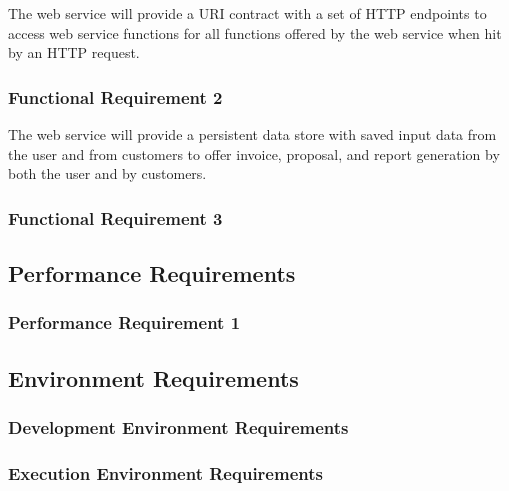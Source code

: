 \documentclass{article}
\begin{document}
The web service will provide a URI contract with a set of HTTP endpoints
to access web service functions for all functions offered by the web service
when hit by an HTTP request.

\subsubsection{Functional Requirement 2}

The web service will provide a persistent data store with saved input data from
the user and from customers to offer invoice, proposal, and report generation
by both the user and by customers.

\subsubsection{Functional Requirement 3}

\subsection{Performance Requirements}
\subsubsection{Performance Requirement 1}
\subsection{Environment Requirements}
\subsubsection{Development Environment Requirements}
\subsubsection{Execution Environment Requirements}
\end{document}
